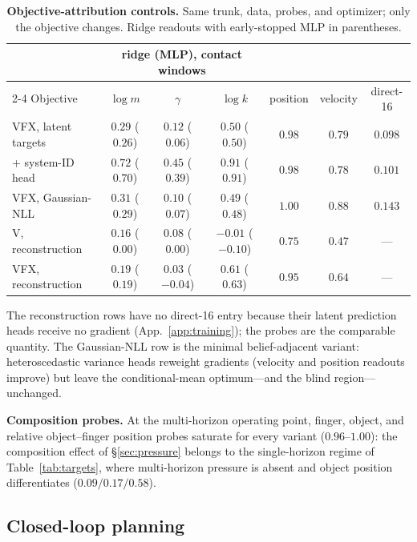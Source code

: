 \documentclass{article} %
\begin{document}
\begin{table}[H]
\caption{\textbf{Objective-attribution controls.} Same trunk, data, probes, and optimizer; only the objective changes. Ridge readouts with early-stopped MLP in parentheses.}
\label{tab:controls}
\begin{center}
\small
\begin{tabular}{lcccccc}
\toprule
\rowcolor{tabhead} & \multicolumn{3}{c}{ridge (MLP), contact windows} & & & \\
\cmidrule(lr){2-4}
\rowcolor{tabhead} Objective & $\log m$ & $\gamma$ & $\log k$ & position & velocity & direct-16 \\
\midrule
\rowcolor{tabours} VFX, latent targets & $0.29$ ($0.26$) & $0.12$ ($0.06$) & $0.50$ ($0.50$) & $0.98$ & $0.79$ & $0.098$ \\
\;\;+ system-ID head & $0.72$ ($0.70$) & $0.45$ ($0.39$) & $0.91$ ($0.91$) & $0.98$ & $0.78$ & $0.101$ \\
VFX, Gaussian-NLL & $0.31$ ($0.29$) & $0.10$ ($0.07$) & $0.49$ ($0.48$) & $1.00$ & $0.88$ & $0.143$ \\
V, reconstruction & $0.16$ ($0.00$) & $0.08$ ($0.00$) & $-0.01$ ($-0.10$) & $0.75$ & $0.47$ & --- \\
VFX, reconstruction & $0.19$ ($0.19$) & $0.03$ ($-0.04$) & $0.61$ ($0.63$) & $0.95$ & $0.64$ & --- \\
\bottomrule
\end{tabular}
\end{center}
\end{table}

The reconstruction rows have no direct-16 entry because their latent
prediction heads receive no gradient (App.~\ref{app:training}); the probes
are the comparable quantity. The Gaussian-NLL row is the minimal
belief-adjacent variant: heteroscedastic variance heads reweight gradients
(velocity and position readouts improve) but leave the conditional-mean
optimum---and the blind region---unchanged.

\textbf{Composition probes.} At the multi-horizon operating point, finger,
object, and relative object--finger position probes saturate for every
variant ($0.96$--$1.00$): the composition effect of \S\ref{sec:pressure}
belongs to the single-horizon regime of Table~\ref{tab:targets}, where
multi-horizon pressure is absent and object position differentiates
($0.09/0.17/0.58$).

\subsection{Closed-loop planning}
\label{app:planning}
\end{document}
